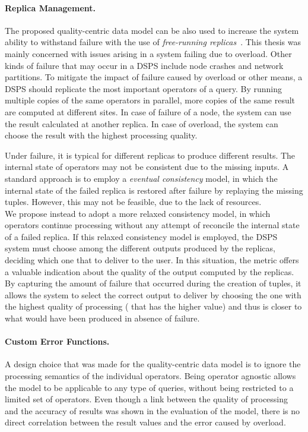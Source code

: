 \paragraph{Replica Management.}
The proposed quality-centric data model can be also used to increase the system ability to withstand
failure with the use of \emph{free-running replicas}~\cite{dependable-is-sensing}. This thesis was mainly
concerned with issues arising in a system failing due to overload. Other kinds of failure that may occur
in a DSPS include node crashes and network partitions. To mitigate the impact of failure caused by
overload or other means, a DSPS should replicate the most important operators of a query. By running
multiple copies of the same operators in parallel, more copies of the same result are computed at
different sites. In case of failure of a node, the system can use the result calculated at another
replica. In case of overload, the system can choose the result with the highest processing quality.

Under failure, it is typical for different replicas to produce different results. The internal state
of operators may not be consistent due to the missing inputs. A standard approach is to employ a
\emph{eventual consistency} model, in which the internal state of the failed replica is restored after
failure by replaying the missing tuples. However, this may not be feasible, due to
the lack of resources.\\
We propose instead to adopt a more relaxed consistency model, in which operators continue processing
without any attempt of reconcile the internal state of a failed replica.
If this relaxed consistency model is employed, the DSPS system must choose among the different outputs
produced by the replicas, deciding which one that to deliver to the user. In this situation, the \sic
metric offers a valuable indication about the quality of the output computed by the replicas. By
capturing the amount of failure that occurred during the creation of tuples, it allows the system to
select the correct output to deliver by choosing the one with the highest quality of processing (\ie
that has the higher \sic value) and thus is closer to what would have been produced in absence of
failure.
\vspace{-10pt}
\paragraph{Custom Error Functions.}
A design choice that was made for the quality-centric data model is to ignore the processing semantics of
the individual operators. Being operator agnostic allows the model to be applicable to any type of
queries, without being restricted to a limited set of operators. Even though a link between the quality of
processing and the accuracy of results was shown in the evaluation of the model, there is no direct
correlation between the result \sic values and the error caused by overload.

